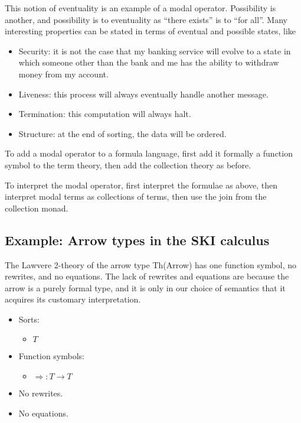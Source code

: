 \documentclass{article}
\newcommand{\maps}{\colon}
\newcommand{\lhom}{\Rightarrow}
\begin{document}
This notion of eventuality is an example of a modal operator.  Possibility is another, and possibility is to eventuality as ``there exists'' is to ``for all''.  Many interesting properties can be stated in terms of eventual and possible states, like
\begin{itemize}
  \item Security: it is not the case that my banking service will evolve to a state in which someone other than the bank and me has the ability to withdraw money from my account.
  \item Liveness: this process will always eventually handle another message.
  \item Termination: this computation will always halt.
  \item Structure: at the end of sorting, the data will be ordered.
\end{itemize}

To add a modal operator to a formula language, first add it formally a function symbol to the term theory, then add the collection theory as before.  

To interpret the modal operator, first interpret the formulae as above, then interpret modal terms as collections of terms, then use the join from the collection monad.

\subsection{Example: Arrow types in the SKI calculus}

The Lawvere 2-theory of the arrow type Th(Arrow) has one function symbol, no rewrites, and no equations.  The lack of rewrites and equations are because the arrow is a purely formal type, and it is only in our choice of semantics that it acquires its customary interpretation.
\begin{itemize}
  \item Sorts:
  \begin{itemize}
    \item $T$
  \end{itemize}
  \item Function symbols:
    \begin{itemize}
      \item $\lhom\maps T \to T$
    \end{itemize}
  \item No rewrites.
  \item No equations.
\end{itemize}
\end{document}
